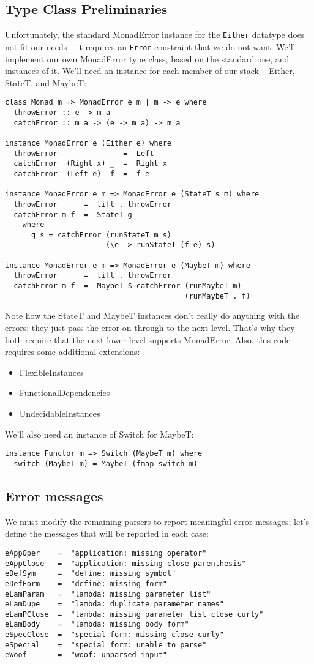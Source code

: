 \documentclass{tmr}
\begin{document}
\subsection{Type Class Preliminaries}
Unfortunately, the standard MonadError instance for the \verb+Either+ datatype does
not fit our needs -- it requires an \verb+Error+ constraint that we do not want.
We'll implement our own MonadError type class, based on the
standard one, and instances of it.  We'll need an instance for each member of
our stack -- Either, StateT, and MaybeT: 
\begin{verbatim}
class Monad m => MonadError e m | m -> e where
  throwError :: e -> m a
  catchError :: m a -> (e -> m a) -> m a

instance MonadError e (Either e) where
  throwError               =  Left
  catchError  (Right x) _  =  Right x
  catchError  (Left e)  f  =  f e
  
instance MonadError e m => MonadError e (StateT s m) where
  throwError      =  lift . throwError
  catchError m f  =  StateT g
    where
      g s = catchError (runStateT m s) 
                       (\e -> runStateT (f e) s)

instance MonadError e m => MonadError e (MaybeT m) where
  throwError      =  lift . throwError
  catchError m f  =  MaybeT $ catchError (runMaybeT m) 
                                         (runMaybeT . f)
\end{verbatim}
Note how the StateT and MaybeT instances don't really do anything with the
errors; they just pass the error on through to the next level.  That's why they
both require that the next lower level supports MonadError.  Also, this code 
requires some additional extensions:
\begin{itemize}
  \item FlexibleInstances
  \item FunctionalDependencies
  \item UndecidableInstances 
\end{itemize}

We'll also need an instance of Switch for MaybeT:
\begin{verbatim}
instance Functor m => Switch (MaybeT m) where
  switch (MaybeT m) = MaybeT (fmap switch m)
\end{verbatim}

\subsection{Error messages}
We must modify the remaining parsers to report meaningful error messages; let's
define the messages that will be reported in each case:
\begin{verbatim}
eAppOper    =  "application: missing operator"
eAppClose   =  "application: missing close parenthesis"
eDefSym     =  "define: missing symbol"
eDefForm    =  "define: missing form"
eLamParam   =  "lambda: missing parameter list"
eLamDupe    =  "lambda: duplicate parameter names"
eLamPClose  =  "lambda: missing parameter list close curly"
eLamBody    =  "lambda: missing body form"
eSpecClose  =  "special form: missing close curly"
eSpecial    =  "special form: unable to parse"
eWoof       =  "woof: unparsed input"
\end{verbatim}
\end{document}
